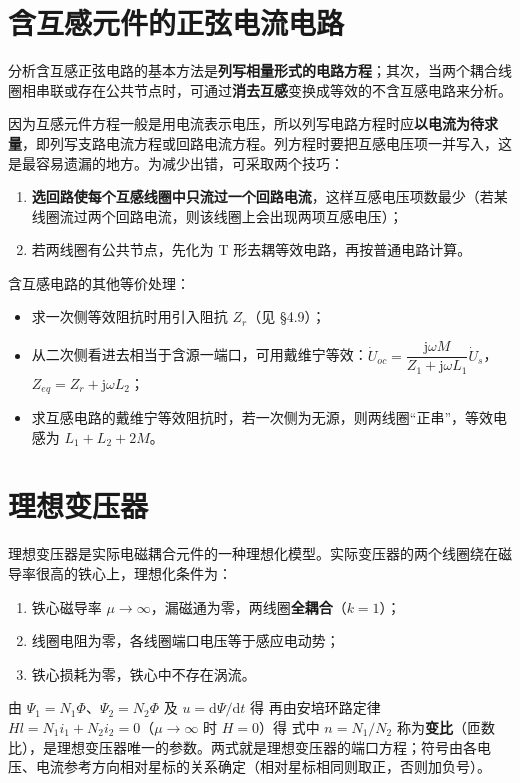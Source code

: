 \section{含互感元件的正弦电流电路}
分析含互感正弦电路的基本方法是\textbf{列写相量形式的电路方程}；其次，当两个耦合线圈相串联或存在公共节点时，可通过\textbf{消去互感}变换成等效的不含互感电路来分析。

因为互感元件方程一般是用电流表示电压，所以列写电路方程时应\textbf{以电流为待求量}，即列写支路电流方程或回路电流方程。列方程时要把互感电压项一并写入，这是最容易遗漏的地方。为减少出错，可采取两个技巧：
\begin{enumerate}
  \item \textbf{选回路使每个互感线圈中只流过一个回路电流}，这样互感电压项数最少（若某线圈流过两个回路电流，则该线圈上会出现两项互感电压）；
  \item 若两线圈有公共节点，先化为 T 形去耦等效电路，再按普通电路计算。
\end{enumerate}

含互感电路的其他等价处理：
\begin{itemize}
  \item 求一次侧等效阻抗时用引入阻抗 $Z_r$（见 §4.9）；
  \item 从二次侧看进去相当于含源一端口，可用戴维宁等效：$\dot{U}_{oc}=\dfrac{\mathrm{j}\omega M}{Z_1+\mathrm{j}\omega L_1}\dot{U}_s$，$Z_{eq}=Z_r+\mathrm{j}\omega L_2$；
  \item 求互感电路的戴维宁等效阻抗时，若一次侧为无源，则两线圈“正串”，等效电感为 $L_1+L_2+2M$。
\end{itemize}

\section{理想变压器}
理想变压器是实际电磁耦合元件的一种理想化模型。实际变压器的两个线圈绕在磁导率很高的铁心上，理想化条件为：
\begin{enumerate}
  \item 铁心磁导率 $\mu\to\infty$，漏磁通为零，两线圈\textbf{全耦合}（$k=1$）；
  \item 线圈电阻为零，各线圈端口电压等于感应电动势；
  \item 铁心损耗为零，铁心中不存在涡流。
\end{enumerate}

由 $\Psi_1=N_1\Phi$、$\Psi_2=N_2\Phi$ 及 $u=\mathrm{d}\Psi/\mathrm{d}t$ 得
再由安培环路定律 $Hl=N_1i_1+N_2i_2=0$（$\mu\to\infty$ 时 $H=0$）得
式中 $n=N_1/N_2$ 称为\textbf{变比}（匝数比），是理想变压器唯一的参数。两式就是理想变压器的端口方程；符号由各电压、电流参考方向相对星标的关系确定（相对星标相同则取正，否则加负号）。

